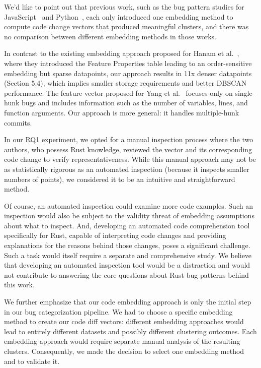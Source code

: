 \documentclass{article}
\begin{document}
We'd like to point out that previous work, such as the bug pattern studies for JavaScript~\cite{hanam2016discovering} and Python~\cite{yang2022mining}, each only introduced one embedding method to compute code change vectors that produced meaningful clusters, and there was no comparison between different embedding methods in those works.

In contrast to the existing embedding approach proposed for Hanam et al.~\cite{hanam2016discovering}, where they introduced the Feature Properties table leading to an order-sensitive embedding but sparse datapoints, our approach results in 11x denser datapoints (Section 5.4), which implies smaller storage requirements and better DBSCAN performance. The feature vector proposed for Yang et al.~\cite{yang2022mining} focuses only on single-hunk bugs and includes information such as the number of variables, lines, and function arguments. Our approach is more general: it handles multiple-hunk commits.

In our RQ1 experiment, we opted for a manual inspection process where the two authors, who possess Rust knowledge, reviewed the vector and its corresponding code change to verify representativeness. While this manual approach may not be as statistically rigorous as an automated inspection (because it inspects smaller numbers of points), we considered it to be an intuitive and straightforward method.

Of course, an automated inspection could examine more code examples. Such an inspection would also be subject to the validity threat of embedding assumptions about what to inspect. And, developing an automated code comprehension tool specifically for Rust, capable of interpreting code changes and providing explanations for the reasons behind those changes, poses a significant challenge. Such a task would itself require a separate and comprehensive study. We believe that developing an automated inspection tool would be a distraction and would not contribute to answering the core questions about Rust bug patterns behind this work.

We further emphasize that our code embedding approach is only the initial step in our bug categorization pipeline. We had to choose a specific embedding method to create our code diff vectors: different embedding approaches would lead to entirely different datasets and possibly different clustering outcomes. Each embedding approach would require separate manual analysis of the resulting clusters. Consequently, we made the decision to select one embedding method and to validate it.
\end{document}
